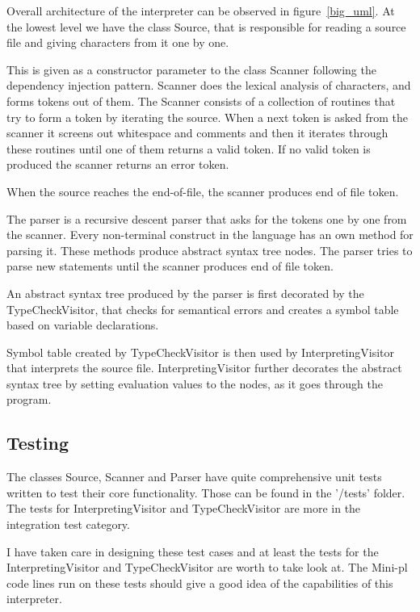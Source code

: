 \documentclass[12pt,a4paper]{article}
\begin{document}
Overall architecture of the interpreter can be observed in figure~\ref{big_uml}.
At the lowest level we have the class Source, that is responsible
for reading a source file and giving characters from it one by one.

This is given as a constructor parameter to the class Scanner following
the dependency injection pattern. Scanner
does the lexical analysis of characters, and forms tokens out
of them. The Scanner consists of a collection of routines that
try to form a token by iterating the source. When a next
token is asked from the scanner it screens out whitespace and
comments and then it iterates through these
routines until one of them returns a valid token. If no
valid token is produced the scanner returns an error token.

When the source reaches the end-of-file, the scanner produces
end of file token.

The parser is a recursive descent parser that asks for the tokens
one by one from the scanner. Every non-terminal construct in the language has
an own method for parsing it. These methods produce abstract syntax 
tree nodes. 
The parser tries to parse new statements until the scanner produces
end of file token.

An abstract syntax tree produced by the parser
is first decorated by the TypeCheckVisitor, that
checks for semantical errors and creates a symbol table
based on variable declarations.

Symbol table created by TypeCheckVisitor is then used by
InterpretingVisitor that interprets the source file.
InterpretingVisitor further decorates the abstract 
syntax tree by setting evaluation values to the nodes,
as it goes through the program.



\subsection{Testing}

The classes Source, Scanner and Parser have quite comprehensive
unit tests written to test their core functionality. Those
can be found in the '/tests' folder. The tests for
InterpretingVisitor and TypeCheckVisitor are more in 
the integration test category.

I have taken care in 
designing these test cases and at least the tests for the
InterpretingVisitor and TypeCheckVisitor are worth to 
take look at. The Mini-pl code lines run on these tests
should give a good idea of the capabilities of this
interpreter.
\end{document}

